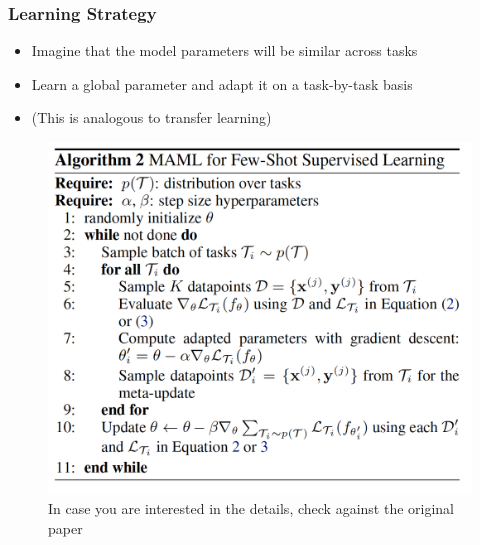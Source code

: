 \documentclass[10pt,mathserif]{beamer}
\begin{document}
\begin{frame}
  \frametitle{Learning Strategy}
 \begin{itemize}
 \item Imagine that the model parameters will be similar across tasks
 \item Learn a global parameter and adapt it on a task-by-task basis
 \item (This is analogous to transfer learning)
 \end{itemize}
\begin{figure}[ht]
  \centering
  \includegraphics[width=0.5\paperwidth]{figure/maml_paper}
  \caption{In case you are interested in the details, check against the original
    paper
    \label{fig:maml_paper} }
\end{figure}
\end{frame}

\begin{frame}[allowframebreaks]
  
    
\end{frame}
\end{document}

